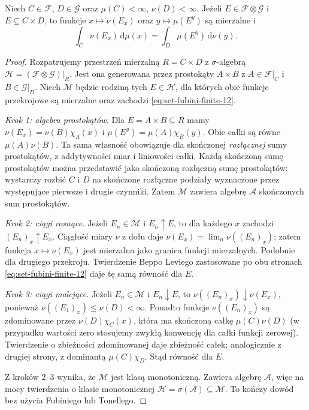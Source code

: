 \begin{lemat}
\label{lem:finite-rectangle-sections-12}
Niech $C\in\mathcal F$, $D\in\mathcal G$ oraz
$\mu(C)<\infty$, $\nu(D)<\infty$. Jeżeli
$E\in\mathcal F\otimes\mathcal G$ i $E\subseteq C\times D$,
to funkcje $x\mapsto\nu(E_x)$ oraz
$y\mapsto\mu(E^y)$ są mierzalne i
\begin{equation}\label{eq:set-fubini-finite-12}
\int_C\nu(E_x)\,\mathrm d\mu(x)
=\int_D\mu(E^y)\,\mathrm d\nu(y).
\end{equation}
\end{lemat}
\begin{proof}
Rozpatrujemy przestrzeń mierzalną
$R=C\times D$ z $\sigma$-algebrą
$\mathcal H=(\mathcal F\otimes\mathcal G)|_R$.
Jest ona generowana przez prostokąty
$A\times B$ z $A\in\mathcal F|_C$ i
$B\in\mathcal G|_D$. Niech $\mathcal M$ będzie
rodziną tych $E\in\mathcal H$, dla których
obie funkcje przekrojowe są mierzalne oraz zachodzi
\eqref{eq:set-fubini-finite-12}.

\emph{Krok 1: algebra prostokątów.}
Dla $E=A\times B\subseteq R$ mamy
$\nu(E_x)=\nu(B)\chi_A(x)$ i
$\mu(E^y)=\mu(A)\chi_B(y)$. Obie całki
są równe $\mu(A)\nu(B)$.
Ta sama własność obowiązuje dla skończonej
\emph{rozłącznej} sumy prostokątów, z addytywności
miar i liniowości całki. Każdą skończoną sumę
prostokątów można przedstawić jako skończoną
rozłączną sumę prostokątów: wystarczy rozbić $C$
i $D$ na skończone rozłączne podziały wyznaczone
przez występujące pierwsze i drugie czynniki.
Zatem $\mathcal M$ zawiera algebrę $\mathcal A$
skończonych sum prostokątów.

\emph{Krok 2: ciągi rosnące.}
Jeżeli $E_n\in\mathcal M$ i $E_n\uparrow E$,
to dla każdego $x$ zachodzi $(E_n)_x\uparrow E_x$.
Ciągłość miary $\nu$ z dołu daje
$\nu(E_x)=\lim_n\nu((E_n)_x)$; zatem funkcja
$x\mapsto\nu(E_x)$ jest mierzalna jako granica
funkcji mierzalnych. Podobnie dla drugiego przekroju.
Twierdzenie Beppo Leviego zastosowane po obu stronach
\eqref{eq:set-fubini-finite-12} daje tę samą
równość dla $E$.

\emph{Krok 3: ciągi malejące.}
Jeżeli $E_n\in\mathcal M$ i $E_n\downarrow E$,
to $\nu((E_n)_x)\downarrow\nu(E_x)$, ponieważ
$\nu((E_1)_x)\le\nu(D)<\infty$. Ponadto funkcje
$\nu((E_n)_x)$ są zdominowane przez
$\nu(D)\chi_C(x)$, która ma skończoną
całkę $\mu(C)\nu(D)$ (w przypadku wartości zero
stosujemy zwykłą konwencję dla całki funkcji zerowej).
Twierdzenie o zbieżności zdominowanej daje zbieżność
całek; analogicznie z drugiej strony, z dominantą
$\mu(C)\chi_D$. Stąd równość dla $E$.

Z kroków 2--3 wynika, że $\mathcal M$ jest klasą
monotoniczną. Zawiera algebrę $\mathcal A$, więc
na mocy twierdzenia o klasie monotonicznej
$\mathcal H=\sigma(\mathcal A)\subseteq\mathcal M$.
To kończy dowód bez użycia Fubiniego lub Tonellego.
\end{proof}

